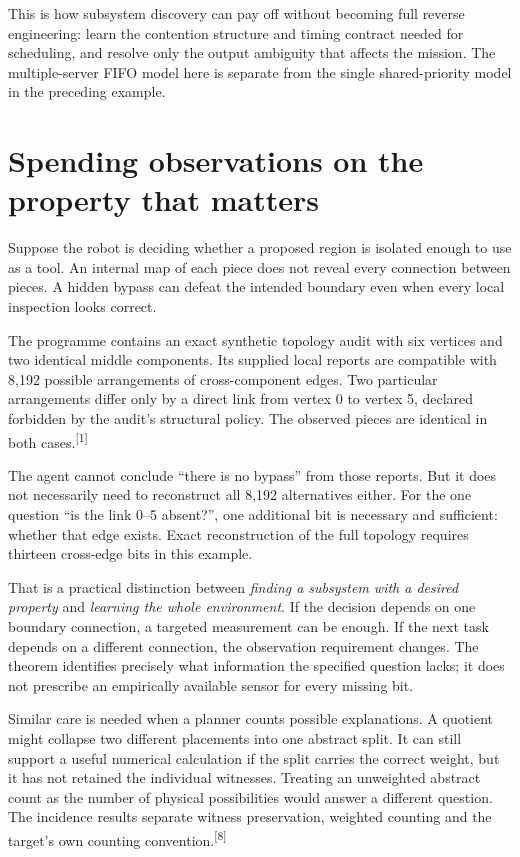 \documentclass[11pt]{article}
\newcommand{\sn}[1]{\textsuperscript{[#1]}}
\begin{document}
This is how subsystem discovery can pay off without becoming full reverse engineering: learn the contention structure and timing contract needed for scheduling, and resolve only the output ambiguity that affects the mission. The multiple-server FIFO model here is separate from the single shared-priority model in the preceding example.

\section{Spending observations on the property that matters}

Suppose the robot is deciding whether a proposed region is isolated enough to use as a tool. An internal map of each piece does not reveal every connection between pieces. A hidden bypass can defeat the intended boundary even when every local inspection looks correct.

The programme contains an exact synthetic topology audit with six vertices and two identical middle components. Its supplied local reports are compatible with 8,192 possible arrangements of cross-component edges. Two particular arrangements differ only by a direct link from vertex 0 to vertex 5, declared forbidden by the audit's structural policy. The observed pieces are identical in both cases.\sn{1}

The agent cannot conclude ``there is no bypass'' from those reports. But it does not necessarily need to reconstruct all 8,192 alternatives either. For the one question ``is the link 0--5 absent?'', one additional bit is necessary and sufficient: whether that edge exists. Exact reconstruction of the full topology requires thirteen cross-edge bits in this example.

That is a practical distinction between \emph{finding a subsystem with a desired property} and \emph{learning the whole environment}. If the decision depends on one boundary connection, a targeted measurement can be enough. If the next task depends on a different connection, the observation requirement changes. The theorem identifies precisely what information the specified question lacks; it does not prescribe an empirically available sensor for every missing bit.

Similar care is needed when a planner counts possible explanations. A quotient might collapse two different placements into one abstract split. It can still support a useful numerical calculation if the split carries the correct weight, but it has not retained the individual witnesses. Treating an unweighted abstract count as the number of physical possibilities would answer a different question. The incidence results separate witness preservation, weighted counting and the target's own counting convention.\sn{8}
\end{document}
